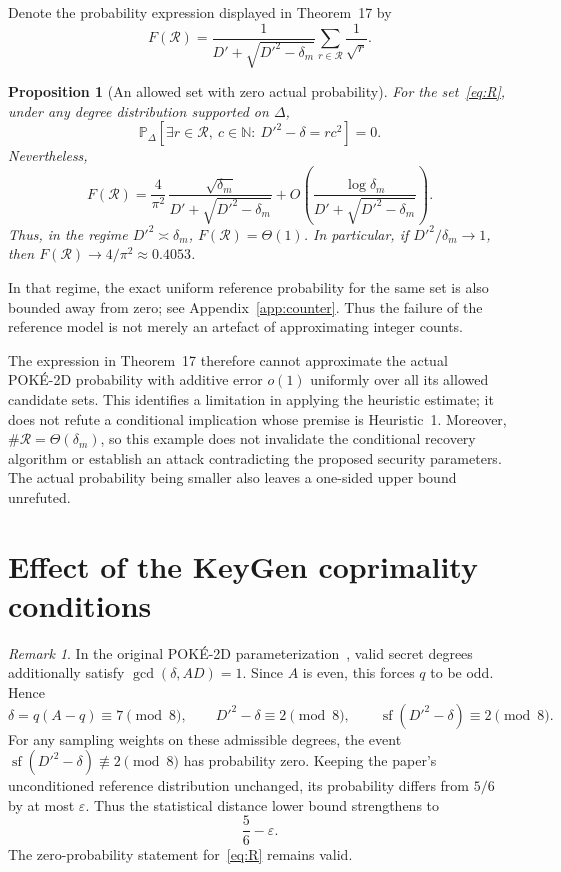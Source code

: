 \documentclass[a4paper,11pt]{article}
\newtheorem{proposition}{Proposition}
\theoremstyle{remark}
\newtheorem*{remark}{Remark}
\DeclareMathOperator{\sfpart}{sf}
\newcommand{\Rset}{\mathcal R}
\newcommand{\PrD}{\mathbb P_{\Delta}}
\newcommand{\N}{\mathbb N}
\begin{document}
Denote the probability expression displayed in Theorem~17 by
\begin{equation}\label{eq:F}
 F(\Rset)=
 \frac{1}{D'+\sqrt{D'^2-\delta_m}}
 \sum_{r\in\Rset}\frac1{\sqrt r}.
\end{equation}

\begin{proposition}[An allowed set with zero actual probability]\label{prop:R}
For the set~\eqref{eq:R}, under any degree distribution supported on
$\Delta$,
\begin{equation}\label{eq:zero}
 \PrD[\exists r\in\Rset,\ c\in\N:\ D'^2-\delta=rc^2]=0.
\end{equation}
Nevertheless,
\begin{equation}\label{eq:Fasym}
F(\Rset)
=
\frac{4}{\pi^2}\,
\frac{\sqrt{\delta_m}}{D'+\sqrt{D'^2-\delta_m}}
+
O\!\left(
\frac{\log\delta_m}{D'+\sqrt{D'^2-\delta_m}}
\right).
\end{equation}
Thus, in the regime $D'^2\asymp\delta_m$, $F(\Rset)=\Theta(1)$.
In particular, if $D'^2/\delta_m\to1$, then
$F(\Rset)\to4/\pi^2\approx0.4053$.
\end{proposition}

In that regime, the exact uniform reference probability for the same set
is also bounded away from zero; see Appendix~\ref{app:counter}.
Thus the failure of the reference model is not merely an artefact of
approximating integer counts.

The expression in Theorem~17 therefore cannot approximate the actual
POK\'E-2D probability with additive error $o(1)$ uniformly over all its
allowed candidate sets. This identifies a limitation in applying the
heuristic estimate; it does not refute a conditional implication whose
premise is Heuristic~1. Moreover, $\#\Rset=\Theta(\delta_m)$, so this example
does not invalidate the conditional recovery algorithm or establish an
attack contradicting the proposed security parameters. The actual
probability being smaller also leaves a one-sided upper bound unrefuted.

\section{Effect of the KeyGen coprimality conditions}

\begin{remark}
In the original POK\'E-2D parameterization~\cite{BassoMaino2025},
valid secret degrees additionally satisfy $\gcd(\delta,AD)=1$.
Since $A$ is even, this forces $q$ to be odd. Hence
\[
 \delta=q(A-q)\equiv7\pmod8,\qquad
 D'^2-\delta\equiv2\pmod8,\qquad
 \sfpart(D'^2-\delta)\equiv2\pmod8.
\]
For any sampling weights on these admissible degrees, the event
$\sfpart(D'^2-\delta)\not\equiv2\pmod8$ has probability zero.
Keeping the paper's unconditioned reference distribution unchanged,
its probability differs from $5/6$ by at most $\varepsilon$.
Thus the statistical distance lower bound strengthens to
\[
 \frac56-\varepsilon.
\]
The zero-probability statement for~\eqref{eq:R} remains valid.
\end{remark}
\end{document}

